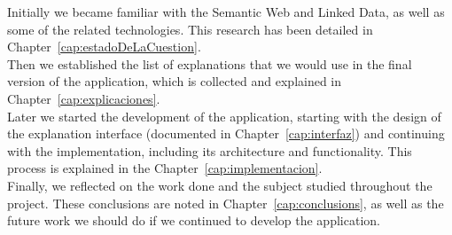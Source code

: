 Initially we became familiar with the Semantic Web and Linked Data, as well as some of the related technologies. This research has been detailed in Chapter~\ref{cap:estadoDeLaCuestion}.\\

Then we established the list of explanations that we would use in the final version of the application, which is collected and explained in Chapter~\ref{cap:explicaciones}.\\

Later we started the development of the application, starting with the design of the explanation interface (documented in Chapter~\ref{cap:interfaz}) and continuing with the implementation, including its architecture and functionality. This process is explained in the Chapter~\ref{cap:implementacion}.\\

Finally, we reflected on the work done and the subject studied throughout the project. These conclusions are noted in Chapter~\ref{cap:conclusions}, as well as the future work we should do if we continued to develop the application.\\